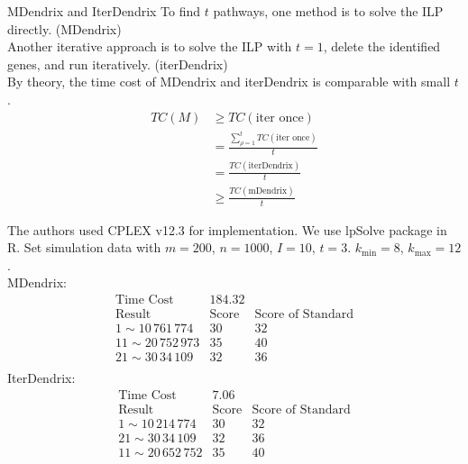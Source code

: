 \documentclass[xcolor=dvipsnames]{beamer}
\begin{document}
\begin{frame}{MDendrix and IterDendrix}
To find $t$ pathways, one method is to solve the ILP directly. (MDendrix)\\
Another iterative approach is to solve the ILP with $t=1$, delete the identified genes, and run iteratively. (iterDendrix)\\
By theory, the time cost of MDendrix and iterDendrix is comparable with small $t$.\\
\begin{displaymath}
\begin{split}
TC(M)&\geqslant TC(\text{iter once})\\
&=\frac{\sum_{\rho=1}^tTC(\text{iter once})}{t}\\
&=\frac{TC(\text{iterDendrix})}{t}\\
&\geqslant \frac{TC(\text{mDendrix})}{t}
\end{split}
\end{displaymath}
\end{frame}
\begin{frame}
The authors used CPLEX v12.3 for implementation. We use lpSolve package in R. Set simulation data with $m=200$, $n=1000$, $I=10$, $t=3$. $k_{\min}=8$, $k_{\max}=12$.\\
MDendrix:\\
\begin{displaymath}
\begin{array}{ccc}
\text{Time Cost}&184.32&\\
\text{Result}&\text{Score}&\text{Score of Standard}\\
1\sim 10\,761\,774&30&32\\
11\sim 20\,752\,973&35&40\\
21\sim 30\,34\,109&32&36\\
\end{array}
\end{displaymath}
IterDendrix:\\
\begin{displaymath}
\begin{array}{ccc}
\text{Time Cost}&7.06&\\
\text{Result}&\text{Score}&\text{Score of Standard}\\
1\sim10\,214\,774&30&32\\
21\sim 30\,34\,109&32&36\\
11\sim 20\,652\,752&35&40
\end{array}
\end{displaymath}
\end{frame}
\end{document}
